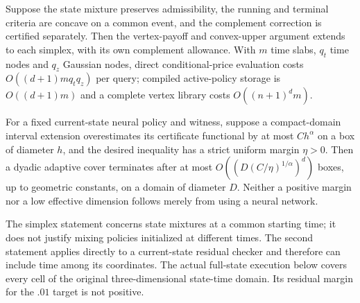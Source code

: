 \begin{proposition}\label{prop:r22cover}
Suppose the state mixture preserves admissibility, the running and terminal criteria are concave on a common event, and the complement correction is certified separately. Then the vertex-payoff and convex-upper argument extends to each simplex, with its own complement allowance. With $m$ time slabs, $q_t$ time nodes and $q_z$ Gaussian nodes, direct conditional-price evaluation costs $O((d+1)mq_tq_z)$ per query; compiled active-policy storage is $O((d+1)m)$ and a complete vertex library costs $O((n+1)^dm)$.

For a fixed current-state neural policy and witness, suppose a compact-domain interval extension overestimates its certificate functional by at most $Ch^\alpha$ on a box of diameter $h$, and the desired inequality has a strict uniform margin $\eta>0$. Then a dyadic adaptive cover terminates after at most $O((D(C/\eta)^{1/\alpha})^d)$ boxes, up to geometric constants, on a domain of diameter $D$. Neither a positive margin nor a low effective dimension follows merely from using a neural network.
\end{proposition}

The simplex statement concerns state mixtures at a common starting time; it does not justify mixing policies initialized at different times. The second statement applies directly to a current-state residual checker and therefore can include time among its coordinates. The actual full-state execution below covers every cell of the original three-dimensional state-time domain. Its residual margin for the $.01$ target is not positive.
